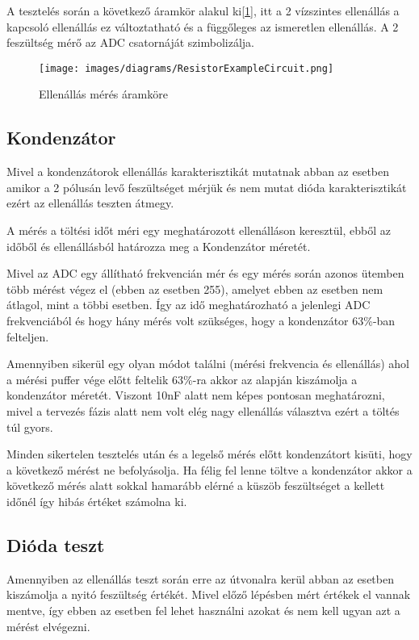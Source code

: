 A tesztelés során a következő áramkör alakul ki[\ref{fig:ResistorExampleCircuit}], 
itt a 2 
vízszintes ellenállás a kapcsoló ellenállás ez változtatható
és a függőleges az ismeretlen ellenállás. A 2 feszültség mérő az ADC
csatornáját szimbolizálja.

\begin{figure}[H]
    \centering
    \texttt{[image: images/diagrams/ResistorExampleCircuit.png]}
    \caption{Ellenállás mérés áramköre}
    \label{fig:ResistorExampleCircuit}
\end{figure}

\subsection{Kondenzátor}

Mivel a kondenzátorok ellenállás karakterisztikát mutatnak abban az esetben
amikor a 2 pólusán levő feszültséget mérjük és nem mutat 
dióda karakterisztikát ezért az ellenállás 
teszten átmegy.

A mérés a töltési időt méri egy meghatározott ellenálláson keresztül,
ebből az időből és ellenállásból határozza meg a Kondenzátor méretét.

Mivel az ADC egy állítható frekvencián mér és egy mérés során azonos ütemben
több mérést végez el (ebben az esetben 255), amelyet ebben az esetben
nem átlagol, mint a többi esetben. Így az idő meghatározható a jelenlegi
ADC frekvenciából és hogy hány mérés volt szükséges, hogy a kondenzátor
63\%-ban felteljen.

Amennyiben sikerül egy olyan módot találni (mérési frekvencia és ellenállás)
ahol a mérési puffer vége előtt feltelik 63\%-ra akkor az alapján kiszámolja
a kondenzátor méretét. Viszont 10nF alatt nem képes pontosan meghatározni,
mivel a tervezés fázis alatt nem volt elég nagy ellenállás választva
ezért a töltés túl gyors.

Minden sikertelen tesztelés után és a legelső mérés előtt kondenzátort kisüti, 
hogy a következő mérést ne befolyásolja. Ha félig fel lenne töltve a kondenzátor
akkor a következő mérés alatt sokkal hamarább elérné a küszöb feszültséget
a kellett időnél így hibás értéket számolna ki.


\subsection{Dióda teszt}

Amennyiben az ellenállás teszt során erre az útvonalra kerül
abban az esetben kiszámolja a nyitó feszültség értékét.
Mivel előző lépésben mért értékek el vannak mentve, így ebben 
az esetben fel lehet használni azokat és nem kell ugyan azt a 
mérést elvégezni.

